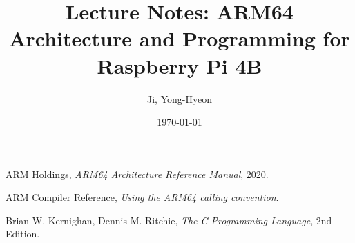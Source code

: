 \documentclass[12pt]{article}
\begin{document}
	
	\title{Lecture Notes: ARM64 Architecture and Programming for Raspberry Pi 4B}
	\author{Ji, Yong-Hyeon}
	\date{\today}
	\maketitle
	
	\tableofcontents  %
	\newpage
	
%	
	
	
	\newpage
	
	
	\newpage
	
	
	\begin{thebibliography}{99}
		ARM Holdings, \textit{ARM64 Architecture Reference Manual}, 2020.
		
		ARM Compiler Reference, \textit{Using the ARM64 calling convention}.
		
		Brian W. Kernighan, Dennis M. Ritchie, \textit{The C Programming Language}, 2nd Edition.
	\end{thebibliography}
	
	
\end{document}
